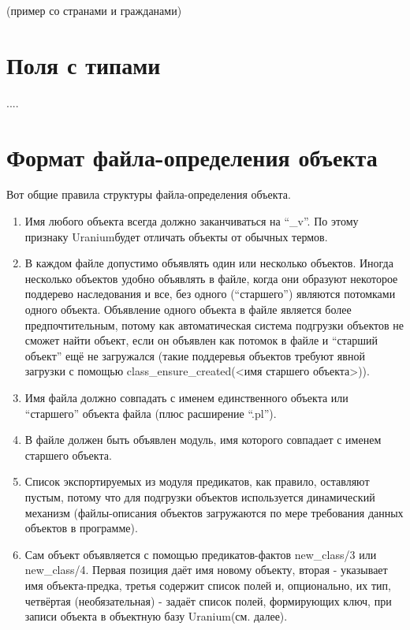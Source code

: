 \documentclass[a4paper]{book}
\def\ur{Uranium}
\begin{document}
(пример со странами и гражданами)

\section{Поля с типами}

....

\section{Формат файла-определения объекта}
\label{object_file_format}

Вот общие правила структуры файла-определения объекта.

\begin{enumerate}
\item Имя любого объекта всегда должно
  заканчиваться на ``\_v''. По этому признаку \ur будет
  отличать объекты от обычных термов.
\item В каждом файле допустимо объявлять один или несколько
  объектов. Иногда несколько объектов удобно объявлять в файле,
  когда они образуют некоторое поддерево наследования и все, без
  одного (``старшего'') являются потомками одного
  объекта. Объявление одного объекта в файле является более
  предпочтительным, потому как автоматическая система подгрузки
  объектов не сможет найти объект, если он объявлен как потомок в
  файле и ``старший объект'' ещё не загружался (такие поддеревья
  объектов требуют явной загрузки с помощью
  class_ensure_created(<имя старшего объекта>)).
\item Имя файла должно совпадать с именем единственного объекта
  или ``старшего'' объекта файла (плюс расширение ``.pl'').
\item В файле должен быть объявлен модуль, имя которого совпадает
  с именем старшего объекта.
\item Список экспортируемых из модуля предикатов, как правило,
  оставляют пустым, потому что для подгрузки объектов
  используется динамический механизм (файлы-описания объектов
  загружаются по мере требования данных объектов в программе).
\item Сам объект объявляется с помощью предикатов-фактов
  new\_class/3 или new\_class/4. Первая позиция даёт имя новому
  объекту, вторая - указывает имя объекта-предка, третья содержит
  список полей и, опционально, их тип, четвёртая (необязательная)
  - задаёт список полей, формирующих ключ, при записи объекта в
  объектную базу \ur (см. далее).
\end{enumerate}
\end{document}
